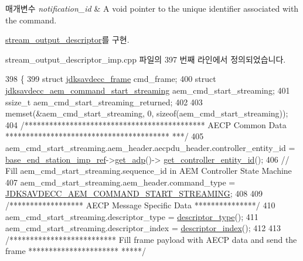 \begin{DoxyParams}{매개변수}
{\em notification\+\_\+id} & A void pointer to the unique identifier associated with the command. \\
\hline
\end{DoxyParams}


\hyperlink{classavdecc__lib_1_1stream__output__descriptor_a9b919107737ba0b3d86c2c316cf3a765}{stream\+\_\+output\+\_\+descriptor}를 구현.



stream\+\_\+output\+\_\+descriptor\+\_\+imp.\+cpp 파일의 397 번째 라인에서 정의되었습니다.


\begin{DoxyCode}
398 \{
399     \textcolor{keyword}{struct }\hyperlink{structjdksavdecc__frame}{jdksavdecc\_frame} cmd\_frame;
400     \textcolor{keyword}{struct }\hyperlink{structjdksavdecc__aem__command__start__streaming}{jdksavdecc\_aem\_command\_start\_streaming} 
      aem\_cmd\_start\_streaming;
401     ssize\_t aem\_cmd\_start\_streaming\_returned;
402 
403     memset(&aem\_cmd\_start\_streaming, 0, \textcolor{keyword}{sizeof}(aem\_cmd\_start\_streaming));
404     \textcolor{comment}{/******************************************** AECP Common Data ****************************************
      ***/}
405     aem\_cmd\_start\_streaming.aem\_header.aecpdu\_header.controller\_entity\_id = 
      \hyperlink{classavdecc__lib_1_1descriptor__base__imp_a550c969411f5f3b69f55cc139763d224}{base\_end\_station\_imp\_ref}->\hyperlink{classavdecc__lib_1_1end__station__imp_a471a74540ce6182fad0c17dfd010107e}{get\_adp}()->
      \hyperlink{classavdecc__lib_1_1adp_a0c0959a46658c0a22e9530334b2912da}{get\_controller\_entity\_id}();
406     \textcolor{comment}{// Fill aem\_cmd\_start\_streaming.sequence\_id in AEM Controller State Machine}
407     aem\_cmd\_start\_streaming.aem\_header.command\_type = 
      \hyperlink{group__command_ga02c5a086ab474b1e4d7786286811a680}{JDKSAVDECC\_AEM\_COMMAND\_START\_STREAMING};
408 
409     \textcolor{comment}{/****************** AECP Message Specific Data ***************/}
410     aem\_cmd\_start\_streaming.descriptor\_type = \hyperlink{classavdecc__lib_1_1descriptor__base__imp_aefc543029ab093823c3f5b9d84f0ccc4}{descriptor\_type}();
411     aem\_cmd\_start\_streaming.descriptor\_index = \hyperlink{classavdecc__lib_1_1descriptor__base__imp_ac23c0a35276c07cfce8c8660700c2135}{descriptor\_index}();
412 
413     \textcolor{comment}{/************************** Fill frame payload with AECP data and send the frame **********************
      *****/}

\end{DoxyCode}
